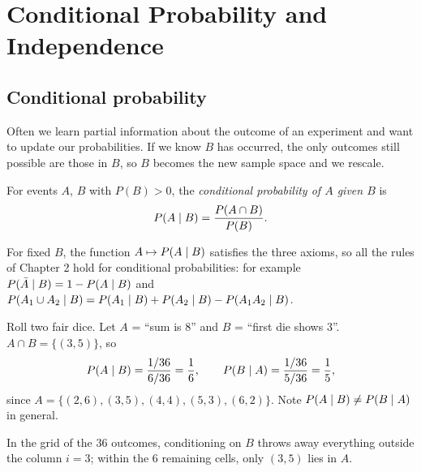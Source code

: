 \chapter{Conditional Probability and Independence}

\section{Conditional probability}

Often we learn partial information about the outcome of an experiment and want to update
our probabilities. If we know $B$ has occurred, the only outcomes still possible are those
in $B$, so $B$ becomes the new sample space and we rescale.

\begin{definition}
For events $A$, $B$ with $P(B) > 0$, the \emph{conditional probability of $A$ given $B$}
is
\[
  P(A \mid B) = \frac{P(A\cap B)}{P(B)}.
\]
\end{definition}

For fixed $B$, the function $A \mapsto P(A\mid B)$ satisfies the three axioms, so all the
rules of Chapter 2 hold for conditional probabilities: for example
$P(\bar A\mid B) = 1 - P(A\mid B)$ and
$P(A_1\cup A_2 \mid B) = P(A_1\mid B) + P(A_2\mid B) - P(A_1A_2\mid B)$.

\begin{example}
Roll two fair dice. Let $A$ = ``sum is $8$'' and $B$ = ``first die shows $3$''.
$A\cap B = \{(3,5)\}$, so
\[
  P(A\mid B) = \frac{1/36}{6/36} = \frac16, \qquad
  P(B\mid A) = \frac{1/36}{5/36} = \frac15,
\]
since $A = \{(2,6),(3,5),(4,4),(5,3),(6,2)\}$. Note $P(A\mid B) \ne P(B\mid A)$ in
general.
\end{example}

In the grid of the $36$ outcomes, conditioning on $B$ throws away everything outside the
column $i=3$; within the $6$ remaining cells, only $(3,5)$ lies in $A$.

\begin{center}
\end{center}

